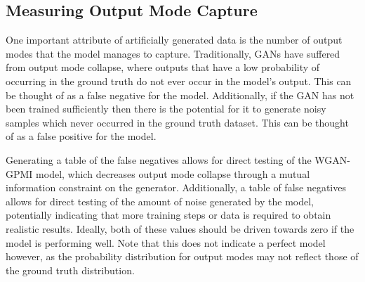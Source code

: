\subsection{Measuring Output Mode Capture}

One important attribute of artificially generated data is the number of output modes that the model manages to capture. Traditionally, GANs have suffered from output mode collapse, where outputs that have a low probability of occurring in the ground truth do not ever occur in the model's output. This can be thought of as a false negative for the model. Additionally, if the GAN has not been trained sufficiently then there is the potential for it to generate noisy samples which never occurred in the ground truth dataset. This can be thought of as a false positive for the model. 

Generating a table of the false negatives allows for direct testing of the WGAN-GPMI model, which decreases output mode collapse through a mutual information constraint on the generator. Additionally, a table of false negatives allows for direct testing of the amount of noise generated by the model, potentially indicating that more training steps or data is required to obtain realistic results. Ideally, both of these values should be driven towards zero if the model is performing well. Note that this does not indicate a perfect model however, as the probability distribution for output modes may not reflect those of the ground truth distribution. 

